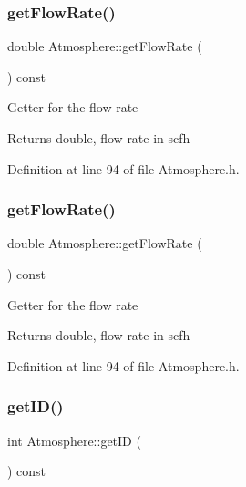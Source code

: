 \subsubsection{\texorpdfstring{get\+Flow\+Rate()}{getFlowRate()}\hspace{0.1cm}{\footnotesize\ttfamily [2/3]}}
{\footnotesize\ttfamily double Atmosphere\+::get\+Flow\+Rate (\begin{DoxyParamCaption}{ }\end{DoxyParamCaption}) const\hspace{0.3cm}{\ttfamily [inline]}}

Getter for the flow rate \begin{DoxyReturn}{Returns}
double, flow rate in scfh 
\end{DoxyReturn}


Definition at line 94 of file Atmosphere.\+h.

\mbox{\label{class_atmosphere_ad34708b12c8c9af4fce47669d68ebf4d}} 
\subsubsection{\texorpdfstring{get\+Flow\+Rate()}{getFlowRate()}\hspace{0.1cm}{\footnotesize\ttfamily [3/3]}}
{\footnotesize\ttfamily double Atmosphere\+::get\+Flow\+Rate (\begin{DoxyParamCaption}{ }\end{DoxyParamCaption}) const\hspace{0.3cm}{\ttfamily [inline]}}

Getter for the flow rate \begin{DoxyReturn}{Returns}
double, flow rate in scfh 
\end{DoxyReturn}


Definition at line 94 of file Atmosphere.\+h.

\mbox{\label{class_atmosphere_a73b921f4d29a4a409488cbdb56c53ff7}} 
\subsubsection{\texorpdfstring{get\+I\+D()}{getID()}\hspace{0.1cm}{\footnotesize\ttfamily [1/3]}}
{\footnotesize\ttfamily int Atmosphere\+::get\+ID (\begin{DoxyParamCaption}{ }\end{DoxyParamCaption}) const\hspace{0.3cm}{\ttfamily [inline]}}


